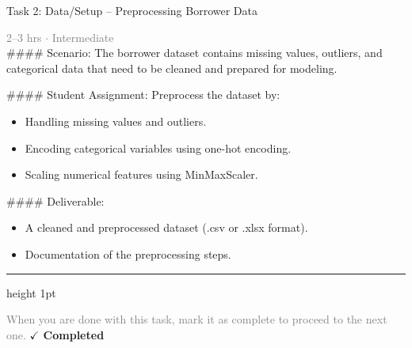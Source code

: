 \documentclass[10pt,a4paper]{article}
\begin{document}
\begin{taskbox}{Task 2: Data/Setup – Preprocessing Borrower Data}

    {\small \textcolor{gray}{2--3 hrs $\cdot$ Intermediate}}\\[12pt]

    \#\#\#\# Scenario:
The borrower dataset contains missing values, outliers, and categorical data that need to be cleaned and prepared for modeling.

\#\#\#\# Student Assignment:
Preprocess the dataset by:
\begin{itemize}
    \item Handling missing values and outliers.
    \item Encoding categorical variables using one-hot encoding.
    \item Scaling numerical features using MinMaxScaler.
\end{itemize}

\#\#\#\# Deliverable:
\begin{itemize}
    \item A cleaned and preprocessed dataset (.csv or .xlsx format).
    \item Documentation of the preprocessing steps.\par
\end{itemize}

    \vspace{16pt}

    \textcolor{cardBorder}{\hrule height 1pt}\vspace{8pt}

    \small \textcolor{gray}{When you are done with this task, mark it as complete to proceed to the next one.} \hfill \textbf{\textcolor{brandDark}{$\checkmark$ Completed}}

\end{taskbox}
\end{document}
